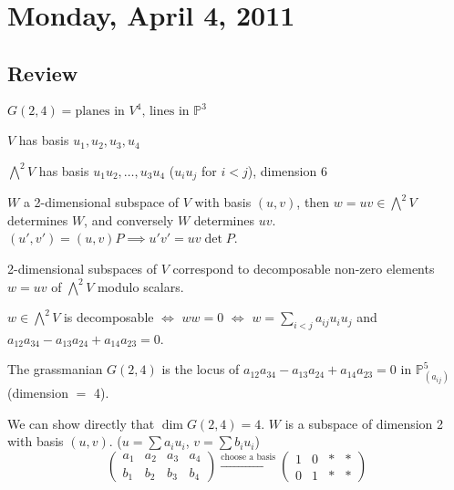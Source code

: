 \documentclass [letterpaper,11pt,twoside]{article}
\begin{document}
\setcounter {section}{21}\section {Monday, April 4, 2011}
  \subsection*{Review}
    $G(2, 4) = \text{planes in }V^4\text{, lines in }\mathbb P^3$

    $V$ has basis $u_1, u_2, u_3, u_4$

    $\bigwedge^2 V$ has basis $u_1u_2, \ldots, u_3u_4$ ($u_i u_j$ for $i < j$), dimension 6

    $W$ a 2-dimensional subspace of $V$ with basis $(u, v)$, then $w = uv \in \bigwedge^2 V$ determines $W$, and conversely $W$ determines $uv$.  $(u', v') = (u, v)P \implies u'v' = uv\det P$.

    \begin{prop*}
      2-dimensional subspaces of $V$ correspond to decomposable non-zero elements $w = uv$ of $\bigwedge^2 V$ modulo scalars.

      $w\in \bigwedge^2 V$ is decomposable $\iff$ $ww = 0$ $\iff$ $w = \sum\limits_{i<j} a_{ij}u_i u_j$ and $a_{12}a_{34} - a_{13}a_{24} + a_{14}a_{23} = 0$.

      The grassmanian $G(2, 4)$ is the locus of $a_{12}a_{34} - a_{13}a_{24} + a_{14}a_{23} = 0$ in $\mathbb P_{(a_{ij})}^5$ (dimension $=$ 4).
    \end{prop*}

  We can show directly that $\dim G(2,4) = 4$.  $W$ is a subspace of dimension 2 with basis $(u, v)$.  ($u = \sum a_i u_i$, $v = \sum b_i u_i$)
  $$\begin{pmatrix} a_1 & a_2 & a_3 & a_4 \\ b_1 & b_2 & b_3 & b_4 \end{pmatrix} \stackrel{\text{choose a basis}}{\to}
    \begin{pmatrix} 1 & 0 & * & * \\ 0 & 1 & * & * \end{pmatrix}$$
\end{document}
